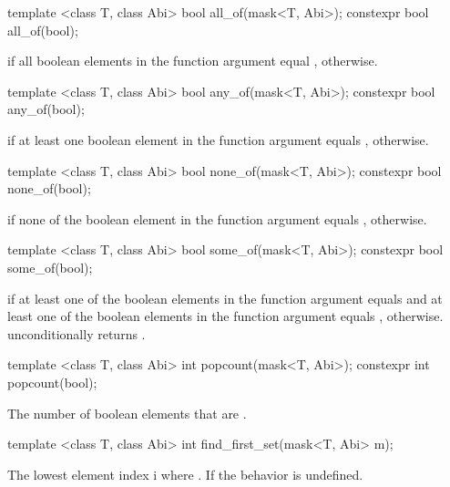 \begin{itemdecl}
template <class T, class Abi> bool  all_of(mask<T, Abi>);
constexpr bool  all_of(bool);
\end{itemdecl}
\begin{itemdescr}
  \pnum\returns \true if all boolean elements in the function argument equal \true, \false otherwise.
\end{itemdescr}

\begin{itemdecl}
template <class T, class Abi> bool  any_of(mask<T, Abi>);
constexpr bool  any_of(bool);
\end{itemdecl}
\begin{itemdescr}
  \pnum\returns \true if at least one boolean element in the function argument equals \true, \false otherwise.
\end{itemdescr}

\begin{itemdecl}
template <class T, class Abi> bool none_of(mask<T, Abi>);
constexpr bool none_of(bool);
\end{itemdecl}
\begin{itemdescr}
  \pnum\returns \true if none of the boolean element in the function argument equals \true, \false otherwise.
\end{itemdescr}

\begin{itemdecl}
template <class T, class Abi> bool some_of(mask<T, Abi>);
constexpr bool some_of(bool);
\end{itemdecl}
\begin{itemdescr}
  \pnum\returns \true if at least one of the boolean elements in the function argument equals \true and at least one of the boolean elements in the function argument equals \false, \false otherwise.
  \pnum\realnote {} unconditionally returns \false.
\end{itemdescr}

\begin{itemdecl}
template <class T, class Abi> int popcount(mask<T, Abi>);
constexpr int popcount(bool);
\end{itemdecl}
\begin{itemdescr}
  \pnum\returns The number of boolean elements that are \true.
\end{itemdescr}

\begin{itemdecl}
template <class T, class Abi> int find_first_set(mask<T, Abi> m);
\end{itemdecl}
\begin{itemdescr}
  \pnum\returns The lowest element index \code i where .
  \pnum\remarks If  the behavior is undefined.
\end{itemdescr}

